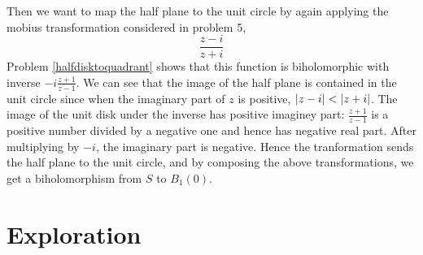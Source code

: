 \documentclass{homework}
\begin{document}
\begin{solution}
                                                                                                          Then we want to map the half plane to the unit circle by again applying the mobius transformation considered in problem 5,
                                                                                                          \[
                                                                                                          \frac{z-i}{z+i}
                                                                                                          \]
                                                                                                          Problem \ref{halfdisktoquadrant} shows that this function is biholomorphic with inverse $-i\frac{z+1}{z-1}$.
                                                                                                          We can see that the image of the half plane is contained in the unit circle since when the imaginary part of $z$ is positive, $\left|z-i\right| < \left|z+i\right|$. The image of the unit disk under the inverse has positive imaginey part: $\frac{z+1}{z-1}$ is a positive number divided by a negative one and hence has negative real part. After multiplying by $-i$, the imaginary part is negative. Hence the tranformation sends the half plane to the unit circle, and by composing the above transformations, we get a biholomorphism from $S$ to $B_1(0)$.
                                                                                                          \end{solution}
                                                                                                          \section{Exploration}
\end{document}
